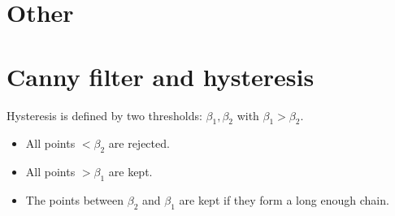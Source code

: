 \section{Other}


\section{Canny filter and hysteresis}

Hysteresis is defined by two thresholds: $\beta_1, \beta_2$ with $\beta_1 > \beta_2$.
\begin{itemize}
    \item All points $< \beta_2$ are rejected.
    \item All points $> \beta_1$ are kept.
    \item The points between $\beta_2$ and $\beta_1$ are kept if they form a long enough chain.
\end{itemize}





